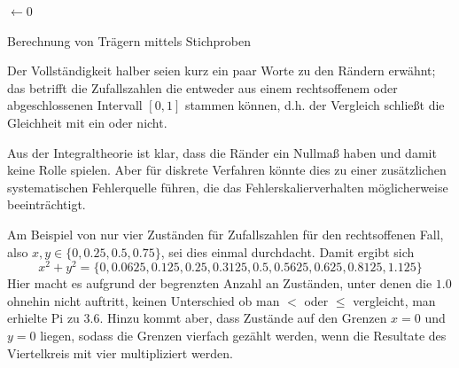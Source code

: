 \begin{algorithm}
    \DontPrintSemicolon
    \BlankLine
    \sum$\leftarrow 0$\;
    \caption{Berechnung von Trägern mittels Stichproben}
    \label{alg:montepi}
\end{algorithm}


Der Vollständigkeit halber seien kurz ein paar Worte zu den Rändern erwähnt; das betrifft die Zufallszahlen die entweder aus einem rechtsoffenem oder abgeschlossenen Intervall $[0,1]$ stammen können, d.h. der Vergleich schließt die Gleichheit mit ein oder nicht.

Aus der Integraltheorie ist klar, dass die Ränder ein Nullmaß haben und damit keine Rolle spielen. Aber für diskrete Verfahren könnte dies zu einer zusätzlichen systematischen Fehlerquelle führen, die das Fehlerskalierverhalten möglicherweise beeinträchtigt.

Am Beispiel von nur vier Zuständen für Zufallszahlen für den rechtsoffenen Fall, also $x,y\in \lbrace 0,0.25,0.5,0.75 \rbrace$, sei dies einmal durchdacht. Damit ergibt sich
\begin{equation}
    x^2+y^2 = \lbrace 0, 0.0625, 0.125, 0.25, 0.3125, 0.5, 0.5625, 0.625, 0.8125, 1.125 \rbrace
\end{equation}
Hier macht es aufgrund der begrenzten Anzahl an Zuständen, unter denen die $1.0$ ohnehin nicht auftritt, keinen Unterschied ob man $<$ oder $\leq$ vergleicht, man erhielte Pi zu $3.6$.
Hinzu kommt aber, dass Zustände auf den Grenzen $x=0$ und $y=0$ liegen, sodass die Grenzen vierfach gezählt werden, wenn die Resultate des Viertelkreis mit vier multipliziert werden.

